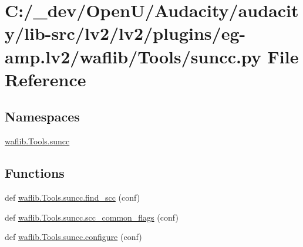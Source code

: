 \hypertarget{lv2_2plugins_2eg-amp_8lv2_2waflib_2_tools_2suncc_8py}{}\section{C\+:/\+\_\+dev/\+Open\+U/\+Audacity/audacity/lib-\/src/lv2/lv2/plugins/eg-\/amp.lv2/waflib/\+Tools/suncc.py File Reference}
\label{lv2_2plugins_2eg-amp_8lv2_2waflib_2_tools_2suncc_8py}
\subsection*{Namespaces}
\begin{DoxyCompactItemize}
\item 
 \hyperlink{namespacewaflib_1_1_tools_1_1suncc}{waflib.\+Tools.\+suncc}
\end{DoxyCompactItemize}
\subsection*{Functions}
\begin{DoxyCompactItemize}
\item 
def \hyperlink{namespacewaflib_1_1_tools_1_1suncc_a810240f3b4d36933a366acad20a2d809}{waflib.\+Tools.\+suncc.\+find\+\_\+scc} (conf)
\item 
def \hyperlink{namespacewaflib_1_1_tools_1_1suncc_a783044dc96ae339c6feba5c8dbb9c95e}{waflib.\+Tools.\+suncc.\+scc\+\_\+common\+\_\+flags} (conf)
\item 
def \hyperlink{namespacewaflib_1_1_tools_1_1suncc_ae6f8e7665e3dfa76f606cbe655d4faf9}{waflib.\+Tools.\+suncc.\+configure} (conf)
\end{DoxyCompactItemize}
